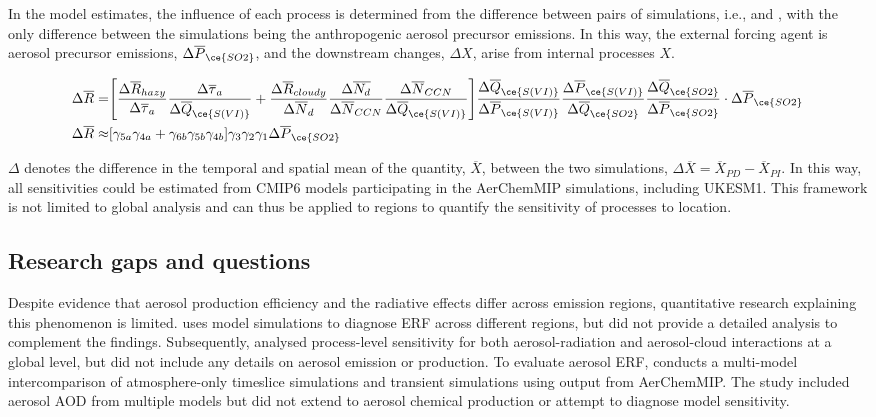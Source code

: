 In the model estimates, the influence of each process is determined from the difference between pairs of simulations, i.e., \histsst{} and \sstpiaer{}, with the only difference between the simulations being the anthropogenic aerosol precursor emissions. In this way, the external forcing agent is aerosol precursor emissions, $\Delta \overline{P}_{\ce{SO2}}$, and the downstream changes, $\Delta X$, arise from internal processes $X$.

\begin{align}
        \Delta \overline{R} = &\Bigg[ 
        \frac{\Delta\overline{R}_{hazy}}{\Delta \overline{\tau}_a}
        \frac{\Delta \overline{\tau}_a}{\Delta \overline{Q}_{\ce{S(VI)}}} 
        + \frac{\Delta\overline{R}_{cloudy}}{\Delta \overline{N}_d}
        \frac{\Delta \overline{N_d}}{\Delta \overline{N}_{CCN}}
        \frac{\Delta \overline{N}_{CCN}}{\Delta \overline{Q}_{\ce{S(VI)}}}
        \Bigg]
        \frac{\Delta \overline{Q}_{\ce{S(VI)}}}{\Delta \overline{P}_{\ce{S(VI)}}}
        \frac{\Delta \overline{P}_{\ce{S(VI)}}}{\Delta \overline{Q}_{\ce{SO2}}}
        \frac{\Delta \overline{Q}_{\ce{SO2}}}{\Delta \overline{P}_{\ce{SO2}}} 
        \cdot \Delta \overline{P}_{\ce{SO2}}  \label{ch5:eq:final_chain} \\
        \Delta \overline{R} \approx & [ \gamma_{5a}\gamma_{4a} + \gamma_{6b}\gamma_{5b}\gamma_{4b}] \gamma_3\gamma_2\gamma_1   \Delta \overline{P}_{\ce{SO2}} 
\end{align}

$\Delta$ denotes the difference in the temporal and spatial mean of the quantity, $\overline{X}$, between the two simulations, $\Delta \overline{X} = \overline{X}_{PD} - \overline{X}_{PI}$. In this way, all sensitivities could be estimated from CMIP6 models participating in the AerChemMIP simulations, including UKESM1. This framework is not limited to global analysis and can thus be applied to regions to quantify the sensitivity of processes to location.

\subsection{Research gaps and questions}

Despite evidence that aerosol production efficiency and the radiative effects differ across emission regions, quantitative research explaining this phenomenon is limited. \citet{bellouinRegionalSeasonalRadiative2016} uses model simulations to diagnose ERF across different regions, but did not provide a detailed analysis to complement the findings. Subsequently, \citet{bellouinBoundingGlobalAerosol2020} analysed process-level sensitivity for both aerosol-radiation and aerosol-cloud interactions at a global level, but did not include any details on aerosol emission or production. To evaluate aerosol ERF, \citet{kalisorasDecomposingEffectiveRadiative2024} conducts a multi-model intercomparison of atmosphere-only timeslice simulations and transient simulations using output from AerChemMIP. The study included aerosol AOD from multiple models but did not extend to aerosol chemical production or attempt to diagnose model sensitivity. 

